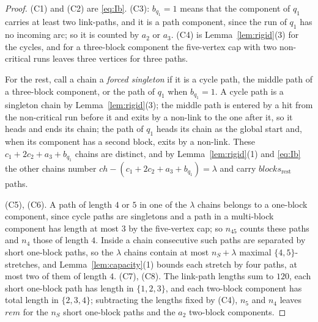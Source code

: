 \documentclass[10pt]{article}
\theoremstyle{remark}
\theoremstyle{plain}
\newcommand{\NCh}{\mathit{ch}}
\begin{document}
\begin{proof}
(C1) and (C2) are \eqref{eq:Ib}.  (C3): $b_{q_1}=1$ means that the
component of $q_1$ carries at least two link-paths, and it is a path
component, since the run of $q_1$ has no incoming arc; so it is counted
by $a_2$ or $a_3$.  (C4) is Lemma~\ref{lem:rigid}(3) for the cycles,
and for a three-block component the five-vertex cap with two
non-critical runs leaves three vertices for three paths.

For the rest, call a chain a \emph{forced singleton} if it is a cycle
path, the middle path of a three-block component, or the path of $q_1$
when $b_{q_1}=1$.  A cycle path is a singleton chain by
Lemma~\ref{lem:rigid}(3); the middle path is entered by a hit from the
non-critical run before it and exits by a non-link to the one after
it, so it heads and ends its chain; the path of $q_1$ heads its chain
as the global start and, when its component has a second block, exits
by a non-link.  These $c_1+2c_2+a_3+b_{q_1}$ chains are distinct, and
by Lemma~\ref{lem:rigid}(1) and \eqref{eq:Ib} the other chains number
$\NCh-(c_1+2c_2+a_3+b_{q_1})=\lambda$ and carry
$\mathit{blocks}_{\mathrm{rest}}$ paths.

(C5), (C6).  A path of length $4$ or $5$ in one of the $\lambda$
chains belongs to a one-block component, since cycle paths are
singletons and a path in a multi-block component has length at most
$3$ by the five-vertex cap; so $n_{45}$ counts these paths and $n_4$
those of length $4$.  Inside a chain consecutive such paths are
separated by short one-block paths, so the $\lambda$ chains contain at
most $n_S+\lambda$ maximal $\{4,5\}$-stretches, and
Lemma~\ref{lem:capacity}(1) bounds each stretch by four paths, at most
two of them of length $4$.  (C7), (C8).  The link-path lengths sum to
$120$, each short one-block path has length in $\{1,2,3\}$, and each
two-block component has total length in $\{2,3,4\}$; subtracting the
lengths fixed by (C4), $n_5$ and $n_4$ leaves $\mathit{rem}$ for the
$n_S$ short one-block paths and the $a_2$ two-block components.


\end{proof}
\end{document}
